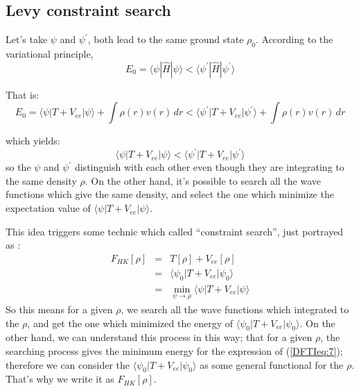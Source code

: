 \subsection{Levy constraint search}
%
%

Let's take $\psi$ and $\psi^{'}$, both lead to the same ground state
$\rho_{0}$. According to the variational principle,
\begin{equation}\label{}
  E_{0}=\langle\psi|\hat{H}|\psi\rangle <
  \langle\psi^{'}|\hat{H}|\psi^{'}\rangle
\end{equation}

That is:
\begin{equation}\label{}
  E_{0}=\langle\psi|T+V_{ee}|\psi\rangle + \int\rho(r)v(r)\,dr <
  \langle\psi^{'}|T+V_{ee}|\psi^{'}\rangle + \int\rho(r)v(r)\,dr
\end{equation}

which yields:
\begin{equation}\label{}
  \langle\psi|T+V_{ee}|\psi\rangle <
  \langle\psi^{'}|T+V_{ee}|\psi^{'}\rangle
\end{equation}
so the $\psi$ and $\psi^{'}$ distinguish with each other even though
they are integrating to the same density $\rho$. On the other hand,
it's possible to search all the wave functions which give the same
density, and select the one which minimize the expectation value of
$\langle\psi|T+V_{ee}|\psi\rangle$.

This idea triggers some technic which called ``constraint search'',
just portrayed as :
\begin{eqnarray}\label{DFTIeq:7}
  F_{HK}[\rho] &=& T[\rho] + V_{ee}[\rho] \nonumber \\
  &=& \langle\psi_{0}|T+V_{ee}|\psi_{0}\rangle \nonumber \\
  &=& \min_{\psi\rightarrow\rho} \langle\psi|T+V_{ee}|\psi\rangle
\end{eqnarray}
So this means for a given $\rho$, we search all the wave functions
which integrated to the $\rho$, and get the one which minimized the
energy of $\langle\psi_{0}|T+V_{ee}|\psi_{0}\rangle$. On the other
hand, we can understand this process in this way; that for a given
$\rho$, the searching process gives the minimum energy for the
expression of (\ref{DFTIeq:7}); therefore we can consider the
$\langle\psi_{0}|T+V_{ee}|\psi_{0}\rangle$ as some general functional
for the $\rho$. That's why we write it as $F_{HK}[\rho]$.

